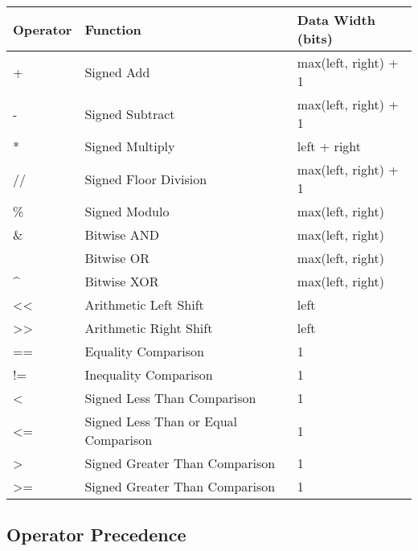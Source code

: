 \documentclass[letterpaper,10pt,english]{manual}
\begin{document}
\begin{tabulary}{\textwidth}{|L|L|L|}
\hline
\textbf{
Operator
} & \textbf{
Function
} & \textbf{
Data Width (bits)
}\\
\hline

+
 & 
Signed Add
 & 
max(left, right) + 1
\\

-
 & 
Signed Subtract
 & 
max(left, right) + 1
\\

*
 & 
Signed Multiply
 & 
left + right
\\

//
 & 
Signed Floor Division
 & 
max(left, right) + 1
\\

\%
 & 
Signed Modulo
 & 
max(left, right)
\\

\&
 & 
Bitwise AND
 & 
max(left, right)
\\

\textbar{}
 & 
Bitwise OR
 & 
max(left, right)
\\

\textasciicircum{}
 & 
Bitwise XOR
 & 
max(left, right)
\\

\textless{}\textless{}
 & 
Arithmetic Left Shift
 & 
left
\\

\textgreater{}\textgreater{}
 & 
Arithmetic Right Shift
 & 
left
\\

==
 & 
Equality Comparison
 & 
1
\\

!=
 & 
Inequality Comparison
 & 
1
\\

\textless{}
 & 
Signed Less Than
Comparison
 & 
1
\\

\textless{}=
 & 
Signed Less Than or Equal
Comparison
 & 
1
\\

\textgreater{}
 & 
Signed Greater Than
Comparison
 & 
1
\\

\textgreater{}=
 & 
Signed Greater Than
Comparison
 & 
1
\\
\hline
\end{tabulary}



\subsection{Operator Precedence}
\end{document}
